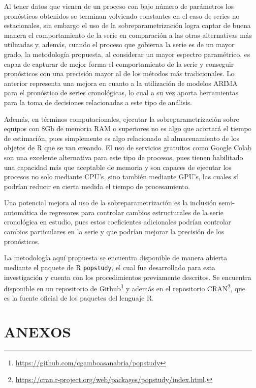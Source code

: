 \documentclass[
]{article}
\begin{document}
Al tener datos que vienen de un proceso con bajo número de parámetros
los pronósticos obtenidos se terminan volviendo constantes en el caso de
series no estacionales, sin embargo el uso de la sobreparametrización
logra captar de buena manera el comportamiento de la serie en
comparación a las otras alternativas más utilizadas y, además, cuando el
proceso que gobierna la serie es de un mayor grado, la metodología
propuesta, al considerar un mayor espectro paramétrico, es capaz de
capturar de mejor forma el comportamiento de la serie y conseguir
pronósticos con una precisión mayor al de los métodos más tradicionales.
Lo anterior representa una mejora en cuanto a la utilización de modelos
ARIMA para el pronóstico de series cronológicas, lo cual a su vez aporta
herramientas para la toma de decisiones relacionadas a este tipo de
análisis.

Además, en términos computacionales, ejecutar la sobreparametrización
sobre equipos con 8Gb de memoria RAM o superiores no es algo que
acortará el tiempo de estimación, pues simplemente es algo relacionado
al almacenamiento de los objetos de R que se van creando. El uso de
servicios gratuitos como Google Colab son una excelente alternativa para
este tipo de procesos, pues tienen habilitado una capacidad más que
aceptable de memoria y son capaces de ejecutar los procesos no solo
mediante CPU's, sino también mediante GPU's, las cuales sí podrían
reducir en cierta medida el tiempo de procesamiento.

Una potencial mejora al uso de la sobreparametrización es la inclusión
semi-automática de regresores para controlar cambios estructurales de la
serie cronológica en estudio, pues estos coeficientes adicionales
podrían controlar cambios particulares en la serie y que podrían mejorar
la precisión de los pronósticos.

La metodología aquí propuesta se encuentra disponible de manera abierta
mediante el paquete de R \texttt{popstudy}, el cual fue desarrollado
para esta investigación y cuenta con los procedimientos previamente
descritos. Se encuentra disponible en un repositorio de
Github\footnote{\url{https://github.com/cgamboasanabria/popstudy}} y
además en el repositorio CRAN\footnote{\url{https://cran.r-project.org/web/packages/popstudy/index.html}.},
que es la fuente oficial de los paquetes del lenguaje R.

\newpage

\section{ANEXOS}
\end{document}
